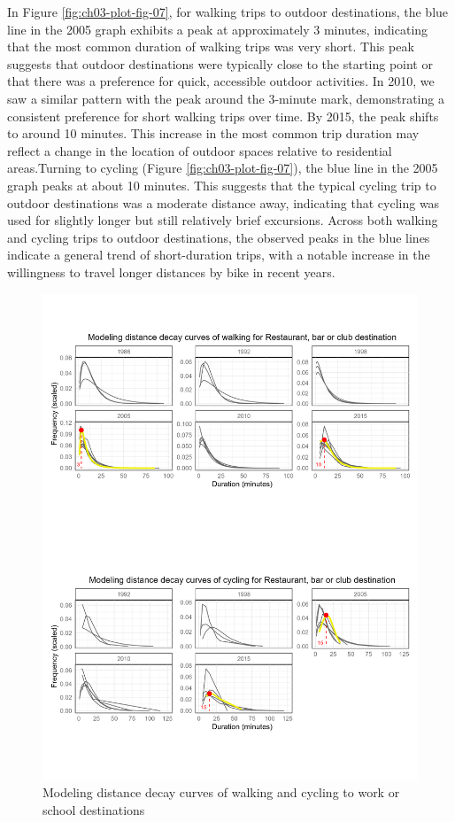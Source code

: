 \documentclass[
11pt, %
oneside, %
english, %
singlespacing, %
]{macthesis} %
\begin{document}
In Figure \ref{fig:ch03-plot-fig-07}, for walking trips to outdoor destinations, the blue line in the 2005 graph exhibits a peak at approximately 3 minutes, indicating that the most common duration of walking trips was very short. This peak suggests that outdoor destinations were typically close to the starting point or that there was a preference for quick, accessible outdoor activities. In 2010, we saw a similar pattern with the peak around the 3-minute mark, demonstrating a consistent preference for short walking trips over time. By 2015, the peak shifts to around 10 minutes. This increase in the most common trip duration may reflect a change in the location of outdoor spaces relative to residential areas.Turning to cycling (Figure \ref{fig:ch03-plot-fig-07}), the blue line in the 2005 graph peaks at about 10 minutes. This suggests that the typical cycling trip to outdoor destinations was a moderate distance away, indicating that cycling was used for slightly longer but still relatively brief excursions. Across both walking and cycling trips to outdoor destinations, the observed peaks in the blue lines indicate a general trend of short-duration trips, with a notable increase in the willingness to travel longer distances by bike in recent years.

\begin{figure}

{\centering \includegraphics[width=1\linewidth]{figure/ch03_fig_08} 

}

\caption{Modeling distance decay curves of walking and cycling to work or school destinations}\label{fig:ch03-plot-fig-08}
\end{figure}
\end{document}
